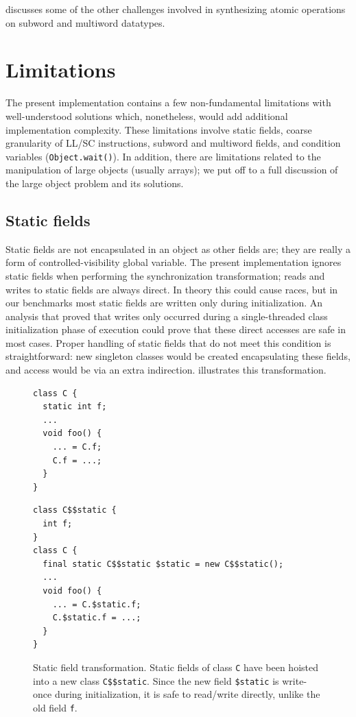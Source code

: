  discusses some of the other challenges involved in
synthesizing atomic operations on subword and multiword datatypes.

\section{Limitations}
The present \apex implementation contains a few non-fundamental
limitations with well-understood solutions which, nonetheless, would
add additional implementation complexity.  These limitations involve static
fields, coarse granularity of LL/SC instructions, subword and
multiword fields, and condition variables (\texttt{Object.wait()}).
In addition, there are
limitations related to the manipulation of large objects (usually
arrays); we put off to  a full discussion of the
large object problem and its solutions.

\subsection{Static fields}
Static fields are not encapsulated in an object as other fields are;
they are really a form of controlled-visibility global variable.  The
present implementation ignores static fields when performing the
synchronization transformation; reads and writes to static fields are
always direct.  In theory this could cause races, but in our
benchmarks most static fields are written only during initialization.
An analysis that proved that writes only occurred during a
single-threaded class initialization phase of execution could prove
that these direct accesses are safe in most cases.  Proper handling of
static fields that do not meet this condition is straightforward:
new singleton classes would be created encapsulating these fields, and
access would be via an extra indirection.  
illustrates this transformation.
\begin{figure}\sis\fontsize{9}{10}
\begin{minipage}[b]{1in}
\begin{verbatim}
class C {
  static int f;
  ...
  void foo() {
    ... = C.f;
    C.f = ...;
  }
}
\end{verbatim}
\end{minipage}
\raisebox{.4in}{$\quad\Rightarrow\quad$}
\begin{minipage}[b]{3in}
\begin{verbatim}
class C$$static {
  int f;
}
class C {
  final static C$$static $static = new C$$static();
  ...
  void foo() {
    ... = C.$static.f;
    C.$static.f = ...;
  }
}
\end{verbatim}
\end{minipage}%
\caption[Static field transformation.]
{Static field transformation.  Static fields of class \texttt{C} have
  been hoisted into a new class \texttt{C\$\$static}.  Since the new
  field \texttt{\$static} is write-once during initialization, it is
  safe to read/write directly, unlike the old field \texttt{f}.}
\label{fig:static-fields}
\end{figure}

